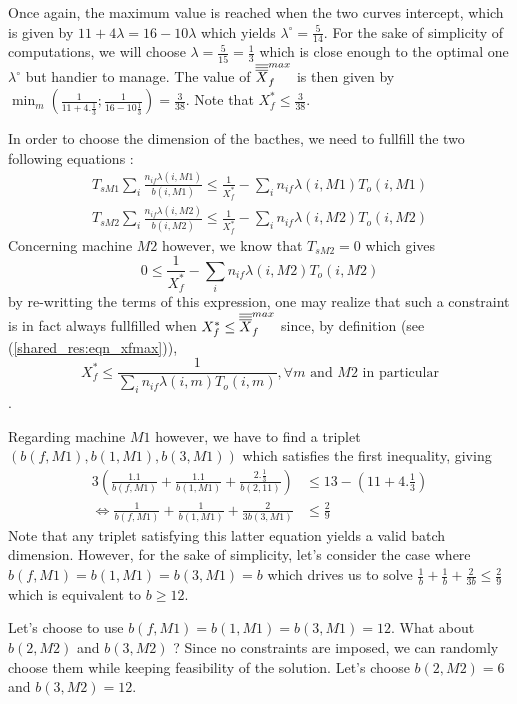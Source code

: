 Once again, the maximum value is reached when the two curves intercept, which is given by $11+4\lambda = 16-10\lambda$ which yields $\lambda^\circ = \frac{5}{14}$. For the sake of simplicity of computations, we will choose $\lambda = \frac{5}{15}=\frac{1}{3}$ which is close enough to the optimal one $\lambda^\circ$ but handier to manage. The value of $\overline{\overline{\overline{X}}}_f^{max}$ is then given by $\min_m\left( \frac{1}{ 11 + 4.\frac{1}{3} } ; \frac{1}{ 16 - 10\frac{1}{3} } \right) = \frac{3}{38}$. Note that $X_f^*\le \frac{3}{38}$. 

In order to choose the dimension of the bacthes, we need to fullfill the two following equations :
\[
    \begin{split}
        T_{sM1}\sum_i\frac{n_{if}\lambda(i,M1)}{b(i,M1)} \le \frac{1}{X_f^*} - \sum_in_{if}\lambda(i,M1)T_o(i,M1)\\
        T_{sM2}\sum_i\frac{n_{if}\lambda(i,M2)}{b(i,M2)} \le \frac{1}{X_f^*} - \sum_in_{if}\lambda(i,M2)T_o(i,M2)
    \end{split}
\]
Concerning machine $M2$ however, we know that $T_{sM2} = 0$ which gives \[ 0\le \frac{1}{X_f^*} - \sum_in_{if}\lambda(i,M2)T_o(i,M2) \] by re-writting the terms of this expression, one may realize that such a constraint is in fact always fullfilled when $X_f^*\le\overline{\overline{\overline{X}}}_f^{max}$ since, by definition (see (\ref{shared_res:eqn_xfmax})), \[ X_f^* \le \frac{1}{\sum_in_{if}\lambda(i,m)T_o(i,m)}, \forall m\textrm{ and }M2\textrm{ in particular} \]. 

Regarding machine $M1$ however, we have to find a triplet $(b(f,M1), b(1,M1), b(3,M1))$ which satisfies the first inequality, giving
\[
    \begin{split}
        3\left( \frac{1.1}{b(f,M1)} + \frac{1.1}{b(1,M1)} + \frac{2.\frac{1}{3}}{b(2,11)} \right) &\le 13 - \left( 11 + 4.\frac{1}{3} \right) \\
        \Leftrightarrow \frac{1}{b(f,M1)} + \frac{1}{b(1,M1)} + \frac{2}{3b(3,M1)} &\le \frac{2}{9}
    \end{split}
\]
Note that any triplet satisfying this latter equation yields a valid batch dimension. However, for the sake of simplicity, let's consider the case where $b(f,M1)=b(1,M1)=b(3,M1)=b$ which drives us to solve $\frac{1}{b} + \frac{1}{b} + \frac{2}{3b} \le \frac{2}{9}$ which is equivalent to $b\ge 12$. 

Let's choose to use $b(f,M1)=b(1,M1)=b(3,M1)=12$. What about $b(2,M2)$ and $b(3,M2)$ ? Since no constraints are imposed, we can randomly choose them while keeping feasibility of the solution. Let's choose $b(2,M2)=6$ and $b(3,M2)=12$. 

